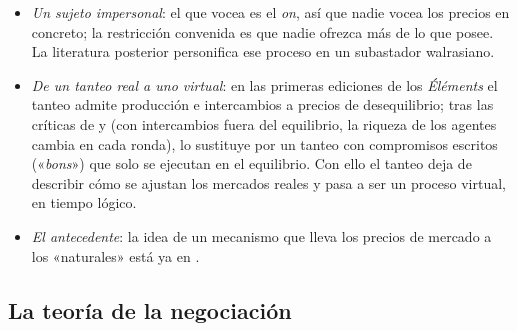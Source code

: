 \documentclass[11pt]{article}
\begin{document}
\begin{itemize}
\item \emph{Un sujeto impersonal}: el que vocea es el \emph{on}, así que nadie vocea los precios en concreto; la restricción convenida es que nadie ofrezca más de lo que posee. La literatura posterior personifica ese proceso en un subastador walrasiano.
\item \emph{De un tanteo real a uno virtual}: en las primeras ediciones de los \emph{Éléments} el tanteo admite producción e intercambios a precios de desequilibrio; tras las críticas de  y  (con intercambios fuera del equilibrio, la riqueza de los agentes cambia en cada ronda),  lo sustituye por un tanteo con compromisos escritos («\emph{bons}») que solo se ejecutan en el equilibrio\nocite{Walker1987Tatonnement}. Con ello el tanteo deja de describir cómo se ajustan los mercados reales y pasa a ser un proceso virtual, en tiempo lógico.
\item \emph{El antecedente}: la idea de un mecanismo que lleva los precios de mercado a los «naturales» está ya en \textcite[libro~I, cap.~VII]{Smith1776Wealth}.
\end{itemize}

\subsection{La teoría de la negociación}\label{anexo:negociacion}
\end{document}
